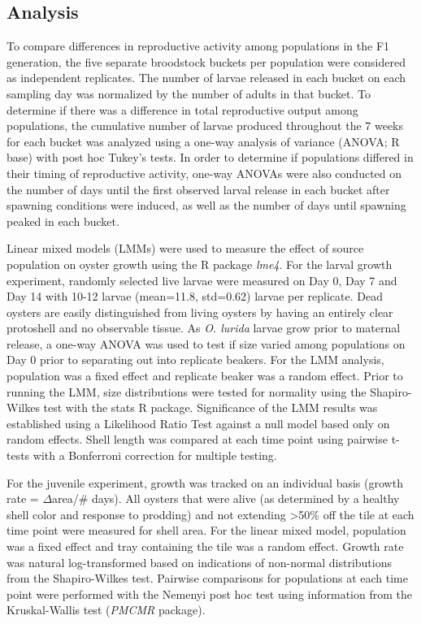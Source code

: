 \documentclass[fleqn,10pt]{wlscirep}
\begin{document}
\subsection*{Analysis}
To compare differences in reproductive activity among populations in the F1 generation, the five separate broodstock buckets per population were considered as independent replicates. The number of larvae released in each bucket on each sampling day was normalized by the number of adults in that bucket. To determine if there was a difference in total reproductive output among populations, the cumulative number of larvae produced throughout the 7 weeks for each bucket was analyzed using a one-way analysis of variance (ANOVA; R base) with post hoc Tukey's tests. In order to determine if populations differed in their timing of reproductive activity, one-way ANOVAs were also conducted on the number of days until the first observed larval release in each bucket after spawning conditions were induced, as well as the number of days until spawning peaked in each bucket.\par 
Linear mixed models (LMMs) were used to measure the effect of source population on oyster growth using the R package \textit{lme4}\cite{Bates2015-ky}. For the larval growth experiment, randomly selected live larvae were measured on Day 0, Day 7 and Day 14 with 10-12 larvae (mean=11.8, std=0.62) larvae per replicate. Dead oysters are easily distinguished from living oysters by having an entirely clear protoshell and no observable tissue. As \textit{O. lurida} larvae grow prior to maternal release, a one-way ANOVA was used to test if size varied among populations on Day 0 prior to separating out into replicate beakers. For the LMM analysis, population was a fixed effect and replicate beaker was a random effect. Prior to running the LMM, size distributions were tested for normality using the Shapiro-Wilkes test with the stats R package. Significance of the LMM results was established using a Likelihood Ratio Test against a null model based only on random effects. Shell length was compared at each time point using pairwise t-tests with a Bonferroni correction for multiple testing. \par 
For the juvenile experiment, growth was tracked on an individual basis (growth rate = $\Delta$area/\# days). All oysters that were alive (as determined by a healthy shell color and response to prodding) and not extending >50\% off the tile at each time point were measured for shell area. For the linear mixed model, population was a fixed effect and tray containing the tile was a random effect. Growth rate was natural log-transformed based on indications of non-normal distributions from the Shapiro-Wilkes test. Pairwise comparisons for populations at each time point were performed with the Nemenyi post hoc test using information from the Kruskal-Wallis test (\textit{PMCMR} package)\cite{Pohlert2014-lr}.\par
\end{document}
